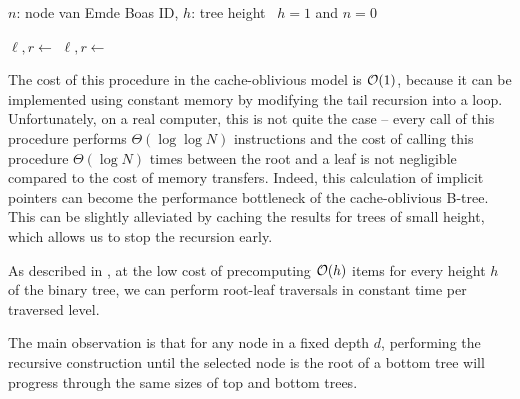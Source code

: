 \begin{algorithmic}
 {$n$: node van Emde Boas ID, $h$: tree height}
	\State \algorithmicif\ {$h = 1$ and $n = 0$}\ \algorithmicthen\ 

	 
	 

		\State $\ell, r \gets$ 
			\State {}
		\Else{}
			\State {}
		\EndIf
	\Else
		\State $\ell,r\gets$ 
			\State {}
		\Else
			 
			\State {}
		\EndIf
	\EndIf
\EndFunction
\end{algorithmic}

The cost of this procedure in the cache-oblivious model is $\mathcal{O}(1)$, because
it can be implemented using constant memory by modifying the tail recursion into
a loop. Unfortunately, on a real computer, this is not quite the case --
every call of this procedure performs $\Theta(\log\log N)$ instructions and
the cost of calling this procedure $\Theta(\log N)$ times between the root
and a leaf is not negligible compared to the cost of memory transfers.
Indeed, this calculation of implicit pointers can become the performance
bottleneck of the cache-oblivious B-tree.
This can be slightly alleviated by caching the results for trees of small
height, which allows us to stop the recursion early.

As described in \cite{brodal01}, at the low cost of precomputing $\mathcal{O}(h)$
items for every height $h$ of the binary tree, we can perform root-leaf
traversals in constant time per traversed level.

The main observation is that for any node in a fixed depth $d$,
performing the recursive construction until the selected node is the root
of a bottom tree will progress through the same sizes of top and bottom trees.


